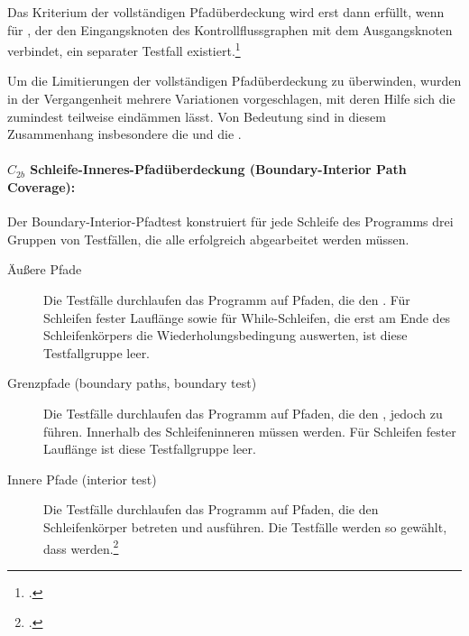 \documentclass{bschlangaul-theorie}
\begin{document}
Das Kriterium der vollständigen Pfadüberdeckung wird erst dann erfüllt,
wenn für , der den Eingangsknoten des
Kontrollflussgraphen mit dem Ausgangsknoten verbindet, ein separater
Testfall existiert.\footcite[Seite 210]{hoffmann:software}

Um die Limitierungen der vollständigen Pfadüberdeckung zu überwinden,
wurden in der Vergangenheit mehrere Variationen vorgeschlagen, mit deren
Hilfe sich die  zumindest teilweise
eindämmen lässt. Von Bedeutung sind in diesem Zusammenhang insbesondere
die  und die
.

%

\paragraph{$C_{2b}$ Schleife-Inneres-Pfadüberdeckung (Boundary-Interior Path Coverage):}

\noindent
Der Boundary-Interior-Pfadtest konstruiert für jede Schleife des
Programms drei Gruppen von Testfällen, die alle erfolgreich abgearbeitet
werden müssen.

\begin{description}
\item[Äußere Pfade]

Die Testfälle durchlaufen das Programm auf Pfaden, die den
. Für Schleifen fester Lauflänge
sowie für While-Schleifen, die erst am Ende des Schleifenkörpers die
Wiederholungsbedingung auswerten, ist diese Testfallgruppe leer.

\item[Grenzpfade (boundary paths, boundary test)]

Die Testfälle durchlaufen das Programm auf Pfaden, die den
, jedoch zu 
führen. Innerhalb des Schleifeninneren müssen  werden. Für Schleifen fester Lauflänge ist diese
Testfallgruppe leer.

\item[Innere Pfade (interior test)]

Die Testfälle durchlaufen das Programm auf Pfaden, die den
Schleifenkörper betreten und 
ausführen. Die Testfälle werden so gewählt, dass 
werden.\footcite[Seite 212]{hoffmann:software}
\end{description}
\end{document}

